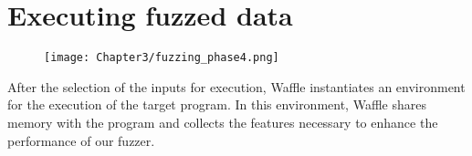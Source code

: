 \section{Executing fuzzed data}

\begin{figure}[h!]
    \centering
    \texttt{[image: Chapter3/fuzzing\_phase4.png]}
\end{figure}

After the selection of the inputs for execution, Waffle instantiates an environment for the execution of the target program. In this environment, Waffle shares memory with the program and collects the features necessary to enhance the performance of our fuzzer.

